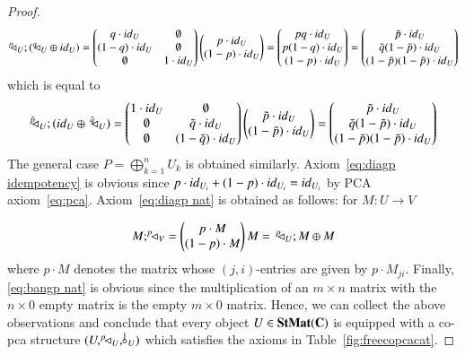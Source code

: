 \begin{proof}
\[ ^p\!\! \lhd_{U};(^q\!\! \lhd_{U}\oplus {id}_{U}) = \begin{pmatrix}
    q\cdot {id}_{U} &  \emptyset \\
    (1-q)\cdot {id}_{U} &  \emptyset\\
    \emptyset & 1\cdot {id}_{U}
\end{pmatrix}
\begin{pmatrix}
    p\cdot {id}_{U} \\
    (1-p)\cdot {id}_{U}
\end{pmatrix}= \begin{pmatrix}
    pq\cdot {id}_{U} \\
    p(1-q)\cdot {id}_{U} \\
    (1-p)\cdot {id}_{U}
\end{pmatrix} = \begin{pmatrix}
    \tilde{p}\cdot {id}_{U} \\
    \tilde{q}(1-\tilde{p})\cdot {id}_{U} \\
    (1-\tilde{p})(1-\tilde{p})\cdot {id}_{U}
    \end{pmatrix} \]
which is equal to
\[ ^{\tilde{p}}\!\! \lhd_{U};({id}_{U}\oplus\, ^{\tilde{q}}\!\! \lhd_{U}) = \begin{pmatrix}
    1\cdot {id}_{U} &  \emptyset\\
    \emptyset & \tilde{q}\cdot {id}_{U} \\
    \emptyset & (1-\tilde{q})\cdot {id}_{U}
\end{pmatrix}
\begin{pmatrix}
    \tilde{p}\cdot {id}_{U} \\
    (1-\tilde{p})\cdot {id}_{U}
\end{pmatrix}= \begin{pmatrix}
    \tilde{p}\cdot {id}_{U} \\
    \tilde{q}(1-\tilde{p})\cdot {id}_{U} \\
    (1-\tilde{p})(1-\tilde{p})\cdot {id}_{U}
\end{pmatrix} \]
The general case $P=\bigoplus_{k=1}^{n} U_k$ is obtained similarly. Axiom~\ref{eq:diagp idempotency} is obvious since $p\cdot {id}_{U_i}+ (1-p)\cdot {id}_{U_i}= {id}_{U_i}$ by PCA axiom~\ref{eq:pca}. 
Axiom~\ref{eq:diagp nat} is obtained as follows: for $M\colon U\to V$

\[M;^p\!\! \lhd_{V} = \begin{pmatrix}
    p\cdot M\\
    (1-p)\cdot M
\end{pmatrix} 
M=\, ^p\!\! \lhd_{U};M\oplus M\]
where $p\cdot M$ denotes the matrix whose $(j,i)$-entries are given by $p\cdot M_{ji}$. 
Finally, \ref{eq:bangp nat} is obvious since the multiplication of an $m\times n$ matrix with the $n\times 0$ empty matrix is the empty $m\times 0$ matrix. Hence, we can collect the above observations and conclude that every object $U\in\mathbf{StMat}(\mathbf{C})$ is equipped with a co-pca structure $(U,\diagp{U},\bangp{U})$ which satisfies the axioms in Table~\ref{fig:freecopcacat}.


\end{proof}
